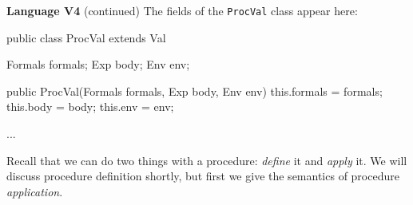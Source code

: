 \begin{minipage}[t]{\sw}
\slidenumber
\LARGE
{\bf Language V4} (continued)\exx
The fields of the \verb'ProcVal' class appear here:
\Large
\begin{qv}
public class ProcVal extends Val {

    Formals formals;
    Exp body;
    Env env;

    public ProcVal(Formals formals, Exp body, Env env) {
        this.formals = formals;
        this.body = body;
        this.env = env;
    }

    ...
}
\end{qv}
\LARGE
Recall that we can do two things with a procedure:
{\em define} it and {\em apply} it.
We will discuss procedure definition shortly,
but first we give the semantics of procedure {\em application}.
\end{minipage}
\clearpage
